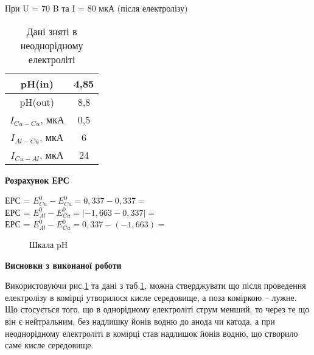\documentclass[a4paper,14pt]{extreport}
\begin{document}
\begin{tcolorbox}[colback=red!20,colframe=black,width=12cm,arc=3mm]
  При U = 70 B та I = 80 мкА (після електролізу)
\end{tcolorbox}
\begin{table}[h]
  \begin{center}
    \begin{tabular}{|c|c|}
      \hline
      pH(in)           & 4,85  \\ \hline
      pH(out)           & 8,8 \\ \hline
      $I_{Cu-Cu}$, мкА & 0,5    \\ \hline
      $I_{Al-Cu}$, мкА & 6    \\ \hline
      $I_{Cu-Al}$, мкА & 24    \\ \hline
    \end{tabular}
    \caption{Дані зняті в неоднорідному електроліті}
    \label{tab2}
  \end{center}
\end{table}

\begin{center}
\textbf{Розрахунок ЕРС}
\end{center}

\FPset{}
\FPset{}

\FPeval{}
ЕРС = $E^0_{Cu} - E^0_{Cu} = 0,337 - 0,337 = $ \FPprint\cucu{} \\

\FPeval{}
ЕРС = $E^0_{Al} - E^0_{Cu}= |-1,663 - 0,337| = $ \FPprint\alcu {}\\

\FPeval{}
ЕРС = $E^0_{Al} - E^0_{Cu} = 0,337 - (-1,663) = $ \FPprint\cual {}\\

\begin{figure}[h]
\caption{Шкала pH}
\label{ris1}
\end{figure}


\newpage
\vspace{5cm}
\begin{center}
\textbf{Висновки з виконаної роботи}
\end{center}
Використовуючи рис.\ref{ris1} та дані з таб.\ref{tab2}, можна стверджувати що після проведення електролізу в комірці утворилося кисле середовище, а поза коміркою -- лужне. Що стосується того, що в однорідному електроліті струм менший, то через те що він є нейтральним, без надлишку йонів водню до анода чи катода, а при
неоднорідному електроліті в комірці став надлишок йонів
водню, що створило саме кисле середовище.%
\end{document}
